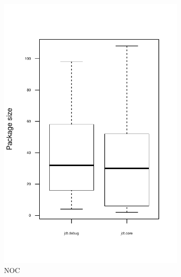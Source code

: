 \begin{figure}
        \begin{subfigure}[b]{0.48\textwidth}
                \centering
                \includegraphics[width=\textwidth]{img/package-size-noc-zoomed.pdf}
                \caption{NOC}
        \end{subfigure}%
        ~ %
        \begin{subfigure}[b]{0.48\textwidth}
                \centering

\end{subfigure}
\end{figure}
